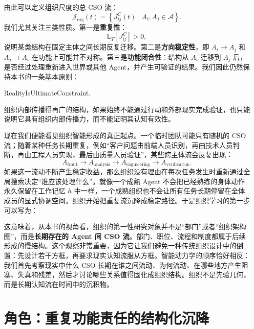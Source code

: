 由此可以定义组织尺度的总 CSO 流：
\[
\mathcal J_{\mathrm{org}}(t)
=
\left\{
J^C_{ij}(t)
\mid
A_i,A_j\in\mathcal A
\right\}.
\]
我们尤其关注三类性质。第一是\textbf{重复性}：
\[
\mathbb E_T[J^C_{ij}]>0,
\]
说明某类结构在固定主体之间长期反复迁移。第二是\textbf{方向稳定性}，即 $A_i\rightarrow A_j$ 和 $A_j\rightarrow A_i$ 在功能上可能并不对称。第三是\textbf{功能闭合性}：结构从 $A_i$ 迁移到 $A_j$ 后，是否经过处理重新进入世界或其他 Agent，并产生可验证的结果。我们因此仍然保持本书的一条基本原则：
\begin{statementbox}
RealityIsUltimateConstraint.
\end{statementbox}
组织内部传播得再广的结构，如果始终不能通过行动和外部现实完成验证，也只能说明它具有组织内部传播力，而不能证明其认知有效性。

现在我们便能看见组织智能形成的真正起点。一个临时团队可能只有随机的 CSO 流；随着某种任务长期重复，例如“客户问题由前端人员识别，再由技术人员判断，再由工程人员实现，最后由质量人员验证”，某些跨主体流会反复出现：
\[
A_{\mathrm{front}}
\rightarrow
A_{\mathrm{analysis}}
\rightarrow
A_{\mathrm{engineering}}
\rightarrow
A_{\mathrm{verification}}.
\]
如果这一流动不断产生稳定收益，那么组织没有理由在每次任务发生时重新通过全局搜索决定“谁应该处理什么”。就像一个成熟 Agent 不会把已经熟练的身体动作永久保留在工作记忆 $h$ 中一样，一个成熟组织也不会让所有任务长期停留在全体成员的显式协调空间。组织开始把重复流沉降成稳定路径。于是组织学习的第一步可以写为：
\begin{statementbox}
\centering
{}
\end{statementbox}

这意味着，从本书的视角看，组织的第一性研究对象并不是“部门”或者“组织架构图”，而是\textbf{长期存在的 Agent 间 CSO 流}。部门、职位、流程和制度都属于后续形成的慢结构。这个观察非常重要，因为它让我们避免一种传统组织设计中的倒置：先设计若干方框，再要求现实认知流服从方框。智能动力学的顺序恰好相反：我们首先考察现实中什么 CSO 长期在谁之间流动、为何流动、在哪些地方产生阻塞、失真和残差，然后才讨论哪些关系值得固化成组织结构。组织不是先验几何，而是长期认知流在时间中的沉积物。


\section{角色：重复功能责任的结构化沉降}
\label{sec:organizational-role}

